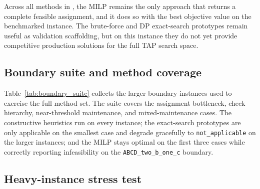 Across all methods in , the MILP remains the only
approach that returns a complete feasible assignment, and it does so with the
best objective value on the benchmarked instance.  The brute-force and DP
exact-search prototypes remain useful as validation scaffolding, but on this
instance they do not yet provide competitive production solutions for the full
TAP search space.

\subsection{Boundary suite and method coverage}

Table~\ref{tab:boundary_suite} collects the larger boundary instances used to
exercise the full method set.  The suite covers the assignment bottleneck,
check hierarchy, near-threshold maintenance, and mixed-maintenance cases.  The
constructive heuristics run on every instance; the exact-search prototypes are
only applicable on the smallest case and degrade gracefully to
\texttt{not\_applicable} on the larger instances; and the MILP stays
optimal on the first three cases while correctly reporting infeasibility on
the \texttt{ABCD\_two\_b\_one\_c} boundary.

\begin{table}[t]
\centering\small
\caption{Boundary suite used to validate that every implemented method runs on
  the key model edges.  Abbreviations: F~=~feasible, O~=~optimal,
  I~=~infeasible, N/A~=~not applicable.}
\label{tab:boundary_suite}
\end{table}

\subsection{Heavy-instance stress test}

